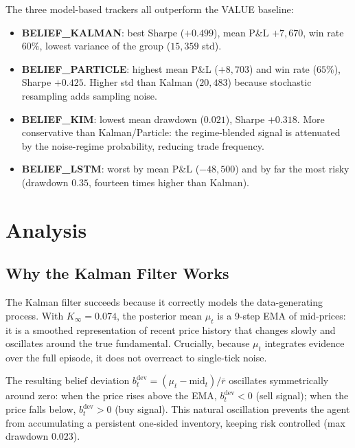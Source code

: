 \documentclass[11pt]{article}
\begin{document}
The three model-based trackers all outperform the VALUE baseline:
\begin{itemize}[leftmargin=1.5em]
  \item \textbf{BELIEF\_KALMAN}: best Sharpe ($+0.499$), mean P\&L $+7{,}670$\textcent,
    win rate $60\%$, lowest variance of the group ($15{,}359$\textcent{} std).
  \item \textbf{BELIEF\_PARTICLE}: highest mean P\&L ($+8{,}703$\textcent)
    and win rate ($65\%$), Sharpe $+0.425$.
    Higher std than Kalman ($20{,}483$\textcent) because stochastic resampling
    adds sampling noise.
  \item \textbf{BELIEF\_KIM}: lowest mean drawdown ($0.021$), Sharpe $+0.318$.
    More conservative than Kalman/Particle: the regime-blended signal is
    attenuated by the noise-regime probability, reducing trade frequency.
  \item \textbf{BELIEF\_LSTM}: worst by mean P\&L ($-48{,}500$\textcent) and
    by far the most risky (drawdown $0.35$, fourteen times higher than Kalman).
\end{itemize}

\section{Analysis}

\subsection{Why the Kalman Filter Works}

The Kalman filter succeeds because it correctly models the data-generating
process.
With $K_\infty = 0.074$, the posterior mean $\mu_t$ is a 9-step EMA of
mid-prices: it is a smoothed representation of recent price history that
changes slowly and oscillates around the true fundamental.
Crucially, because $\mu_t$ integrates evidence over the full episode, it does
not overreact to single-tick noise.

The resulting belief deviation $b_t^{\text{dev}} = (\mu_t - \text{mid}_t)/\bar{r}$
oscillates symmetrically around zero:
when the price rises above the EMA, $b_t^{\text{dev}} < 0$ (sell signal);
when the price falls below, $b_t^{\text{dev}} > 0$ (buy signal).
This natural oscillation prevents the agent from accumulating a persistent
one-sided inventory, keeping risk controlled (max drawdown $0.023$).
\end{document}
